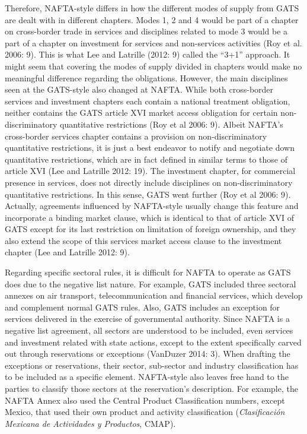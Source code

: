 \documentclass{article}
\begin{document}
\smallskip

Therefore, NAFTA-style differs in how the different modes of supply from GATS are dealt with in different chapters. Modes 1, 2 and 4 would be part of a chapter on cross-border trade in services and disciplines related to mode 3 would be a part of a chapter on investment for services and non-services activities (Roy et al. 2006: 9). This is what Lee and Latrille (2012: 9) called the “3+1” approach. It might seem that covering the modes of supply divided in chapters would make no meaningful difference regarding the obligations. However, the main disciplines seen at the GATS-style also changed at NAFTA. While both cross-border services and investment chapters each contain a national treatment obligation, neither contains the GATS article XVI market access obligation for certain non-discriminatory quantitative restrictions (Roy et al 2006: 9). Albeit NAFTA’s cross-border services chapter contains a provision on non-discriminatory quantitative restrictions, it is just a best endeavor to notify and negotiate down quantitative restrictions, which are in fact defined in similar terms to those of article XVI (Lee and Latrille 2012: 19). The investment chapter, for commercial presence in services, does not directly include disciplines on non-discriminatory quantitative restrictions. In this sense, GATS went further (Roy et al 2006: 9). Actually, agreements influenced by NAFTA-style usually change this feature and incorporate a binding market clause, which is identical to that of article XVI of GATS except for its last restriction on limitation of foreign ownership, and they also extend the scope of this services market access clause to the investment chapter (Lee and Latrille 2012: 9).

\smallskip

Regarding specific sectoral rules, it is difficult for NAFTA to operate as GATS does due to the negative list nature. For example, GATS included three sectoral annexes on air transport, telecommunication and financial services, which develop and complement normal GATS rules. Also, GATS includes an exception for services delivered in the exercise of governmental authority. Since NAFTA is a negative list agreement, all sectors are understood to be included, even services and investment related with state actions, except to the extent specifically carved out through reservations or exceptions (VanDuzer 2014: 3). When drafting the exceptions or reservations, their sector, sub-sector and industry classification has to be included as a specific element. NAFTA-style also leaves free hand to the parties to classify those sectors at the reservation’s description. For example, the NAFTA Annex also used the Central Product Classification numbers, except Mexico, that used their own product and activity classification (\textit{Clasificación Mexicana de Actividades y Productos}, CMAP).
\end{document}
